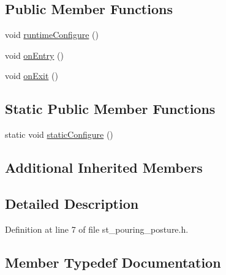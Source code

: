 \subsection*{Public Member Functions}
\begin{DoxyCompactItemize}
\item 
void \hyperlink{structsm__fetch__two__table__whiskey__pour_1_1StPouringPosture_a40f4879b670d560dd455a95e9b93f262}{runtime\+Configure} ()
\item 
void \hyperlink{structsm__fetch__two__table__whiskey__pour_1_1StPouringPosture_a41cc0c484ab7fcd27e95a27d729dd303}{on\+Entry} ()
\item 
void \hyperlink{structsm__fetch__two__table__whiskey__pour_1_1StPouringPosture_ad8a07dd2cbde39c2eb406d69573b791c}{on\+Exit} ()
\end{DoxyCompactItemize}
\subsection*{Static Public Member Functions}
\begin{DoxyCompactItemize}
\item 
static void \hyperlink{structsm__fetch__two__table__whiskey__pour_1_1StPouringPosture_a1cc6115b2faeb234e5c13a47ee5f577e}{static\+Configure} ()
\end{DoxyCompactItemize}
\subsection*{Additional Inherited Members}


\subsection{Detailed Description}


Definition at line 7 of file st\+\_\+pouring\+\_\+posture.\+h.



\subsection{Member Typedef Documentation}
\mbox{\label{structsm__fetch__two__table__whiskey__pour_1_1StPouringPosture_a4cbcbdb61da0bd59a509340474670148}} 
